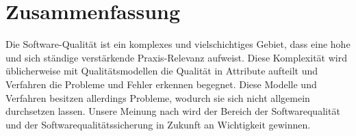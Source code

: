 \chapter{Zusammenfassung}
Die Software-Qualität ist ein komplexes und vielschichtiges Gebiet, dass eine hohe und sich ständige verstärkende Praxis-Relevanz aufweist. Diese Komplexität wird üblicherweise mit Qualitätsmodellen  die Qualität in Attribute aufteilt und Verfahren die Probleme und Fehler erkennen begegnet. Diese Modelle und Verfahren besitzen allerdings Probleme, wodurch sie sich nicht allgemein durchsetzen lassen. Unsere Meinung nach wird der Bereich der Softwarequalität und der Softwarequalitätssicherung in Zukunft an Wichtigkeit gewinnen.